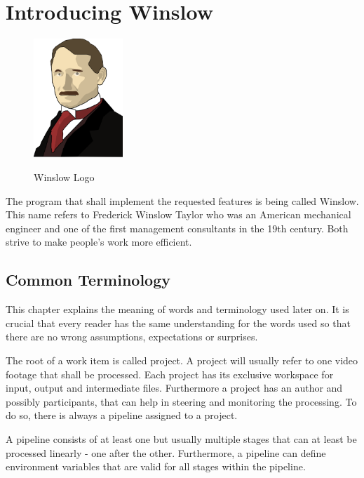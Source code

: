 

\chapter{Introducing Winslow}

\begin{figure}
	\centering
	\vspace{-1.5cm}
	\includegraphics[width=0.3\textwidth]{winslow_friendly_flipped.png}
	\label{winslow:icon}
	\caption{Winslow Logo}
\end{figure}


The program that shall implement the requested features is being called Winslow.
This name refers to Frederick Winslow Taylor who was an American mechanical engineer and one of the first management consultants in the 19th century\cite{wiki:winslow}.
Both strive to make people's work more efficient.


\section{Common Terminology}
\label{winslow:terminology}

This chapter explains the meaning of words and terminology used later on.
It is crucial that every reader has the same understanding for the words used so that there are no wrong assumptions, expectations or surprises.

The root of a work item is called project.
A project will usually refer to one video footage that shall be processed.
Each project has its exclusive workspace for input, output and intermediate files.
Furthermore a project has an author and possibly participants, that can help in steering and monitoring the processing.
To do so, there is always a pipeline assigned to a project.

A pipeline consists of at least one but usually multiple stages that can at least be processed linearly - one after the other.
Furthermore, a pipeline can define environment variables that are valid for all stages within the pipeline.

